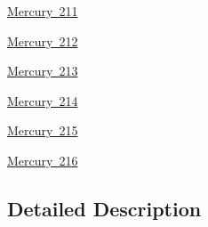 \begin{DoxyCompactItemize}
\mbox{\hyperlink{group___isotope_const-_mercury-_hg211}{Mercury 211}}
\item 
\mbox{\hyperlink{group___isotope_const-_mercury-_hg212}{Mercury 212}}
\item 
\mbox{\hyperlink{group___isotope_const-_mercury-_hg213}{Mercury 213}}
\item 
\mbox{\hyperlink{group___isotope_const-_mercury-_hg214}{Mercury 214}}
\item 
\mbox{\hyperlink{group___isotope_const-_mercury-_hg215}{Mercury 215}}
\item 
\mbox{\hyperlink{group___isotope_const-_mercury-_hg216}{Mercury 216}}
\end{DoxyCompactItemize}


\subsection{Detailed Description}
